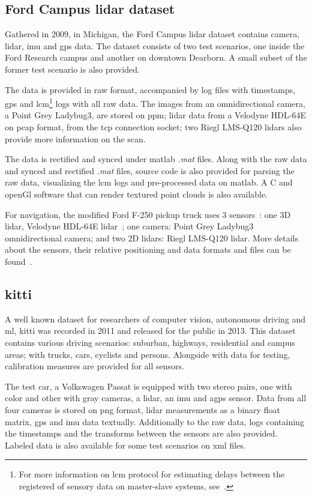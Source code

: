 \subsection{Ford Campus \ac{lidar} dataset}
Gathered in 2009, in Michigan, the Ford Campus \ac{lidar} dataset contains camera, \ac{lidar}, \ac{imu} and \ac{gps} data. The dataset consists of two test scenarios, one inside the Ford Research campus and another on downtown Dearborn. A small subset of the former test scenario is also provided.

The data is provided in raw format, accompanied by log files with timestamps, \ac{gps} and \ac{lcm}\footnote{For more information on \acf{lcm} protocol for estimating delays between the registered of sensory data on master-slave systems, see~\cite{VelodyneHDL64}.} logs with all raw data. The images from an omnidirectional camera, a Point Grey Ladybug3, are stored on \ac{ppm}; \ac{lidar} data from a Velodyne HDL-64E on \ac{pcap} format, from the \ac{tcp} connection socket; two Riegl LMS-Q120 \acp{lidar} also provide more information on the scan.

The data is rectified and synced under \ac{matlab} \textit{.mat} files. Along with the raw data and synced and rectified \textit{.mat} files, source code is also provided for parsing the raw data, visualizing the \ac{lcm} logs and pre-processed data on \ac{matlab}. A C and \ac{openGl} software that can render textured point clouds is also available.

For navigation, the modified Ford F-250 pickup truck uses 3 sensors~\cite{Pandey2011}: one 3D \ac{lidar}, Velodyne HDL-64E lidar~\cite{VelodyneHDL64}; one camera: Point Grey Ladybug3 omnidirectional camera; and two 2D \acp{lidar}: Riegl LMS-Q120 lidar. More details about the sensors, their relative positioning and data formats and files can be found~\cite{Pandey2011}.


\subsection{\ac{kitti}}
A well known dataset for researchers of computer vision, autonomous driving and \ac{ml}, \ac{kitti} was recorded in 2011 and released for the public in 2013. This dataset contains various driving scenarios: suburban, highways, residential and campus areas; with trucks, cars, cyclists and persons. Alongside with data for testing, calibration measures are provided for all sensors.

The test car, a Volkswagen Passat is equipped with two stereo pairs, one with color and other with gray cameras, a \ac{lidar}, an \ac{imu} and a\ac{gps} sensor. Data from all four cameras is stored on \ac{png} format, \ac{lidar} measurements as a binary float matrix, \ac{gps} and {imu} data textually. Additionally to the raw data, logs containing the timestamps and the transforms between the sensors are also provided. Labeled data is also available for some test scenarios on \ac{xml} files.

